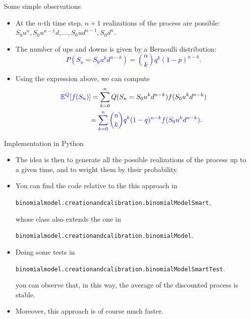 \documentclass[9 pt]{beamer} %
\def \blue {\textcolor{blue}}
\def \bE {\mathbb{E}}
\begin{document}
\begin{frame}{Some simple observations}
\begin{itemize}
\item At the $n$-th time step, $n+1$ realizations of the process are possible: $S_0u^n, S_0u^{n-1}d, \dots,  S_0ud^{n-1}, S_0d^{n}$.
\item The number of ups and downs is given by a Bernoulli distribution: 
\blue{$$
P(S_{n}=S_0u^{k}d^{n-k})=\binom{n}{k}q^k(1-p)^{n-k}.
$$}
\item Using the expression above, we can compute
\begin{align}
\blue{\bE^Q[f(S_{n})]}&=\sum_{k=0}^n Q(S_{n}=S_0u^{k}d^{n-k}) f(S_0u^{k}d^{n-k}) \notag \\
&\blue{= \sum_{k=0}^n \binom{n}{k}q^k(1-q)^{n-k}f(S_0u^{k}d^{n-k})}.\notag
\end{align}
\end{itemize}
\end{frame}


\begin{frame}{Implementation in Python}
\begin{itemize}
\item The idea is then to generate all the possible realizations of the process up to a given time, and to weight them by their probability.
\item You can find the code relative to the this approach in
\begin{center}
\texttt{binomialmodel.creationandcalibration.binomialModelSmart},
\end{center}
whose class also extends the one in
\begin{center}
\texttt{binomialmodel.creationandcalibration.binomialModel}.
\end{center}
\item Doing some tests in
\begin{center}
\texttt{binomialmodel.creationandcalibration.binomialModelSmartTest}.
\end{center}
you can observe that, in this way, the average of the discounted process is stable. 
\item Moreover, this approach is of course much faster.
\end{itemize}
\end{frame}
\end{document}
